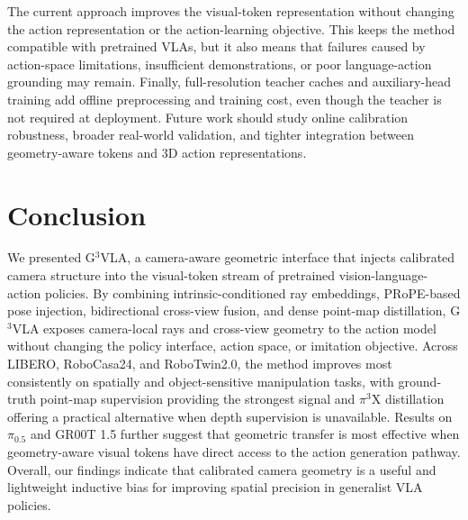 \documentclass{article}
\begin{document}
The current approach improves the visual-token representation without changing the action representation or the action-learning objective. This keeps the method compatible with pretrained VLAs, but it also means that failures caused by action-space limitations, insufficient demonstrations, or poor language-action grounding may remain. Finally, full-resolution teacher caches and auxiliary-head training add offline preprocessing and training cost, even though the teacher is not required at deployment. Future work should study online calibration robustness, broader real-world validation, and tighter integration between geometry-aware tokens and 3D action representations.

\section{Conclusion}
\label{sec:conclusion}

We presented G$^3$VLA, a camera-aware geometric interface that injects calibrated camera structure
into the visual-token stream of pretrained vision-language-action policies. By combining
intrinsic-conditioned ray embeddings, PRoPE-based pose injection, bidirectional cross-view fusion,
and dense point-map distillation, G$^3$VLA exposes camera-local rays and cross-view geometry to
the action model without changing the policy interface, action space, or imitation objective.
Across LIBERO, RoboCasa24, and RoboTwin2.0, the method improves most consistently on
spatially and object-sensitive manipulation tasks, with ground-truth point-map supervision providing
the strongest signal and $\pi^3$X distillation offering a practical alternative when depth supervision
is unavailable. Results on $\pi_{0.5}$ and GR00T 1.5 further suggest that geometric transfer is most
effective when geometry-aware visual tokens have direct access to the action generation pathway.
Overall, our findings indicate that calibrated camera geometry is a useful and lightweight inductive
bias for improving spatial precision in generalist VLA policies.


\clearpage



\clearpage
\appendix

\end{document}
